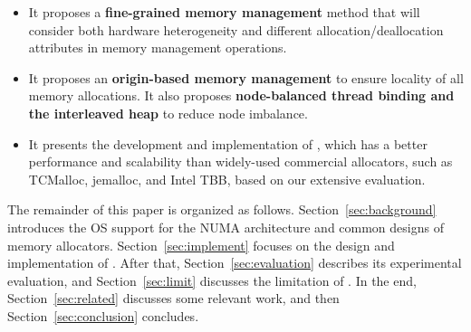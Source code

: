 \begin{itemize}

\item It proposes a \textbf{fine-grained memory management} method that will consider both hardware heterogeneity and different allocation/deallocation attributes in memory management operations.

\item It proposes an \textbf{origin-based memory management} to ensure locality of all memory allocations. It also proposes \textbf{node-balanced thread binding and the interleaved heap} to reduce node imbalance. 

\item It presents the development and implementation of \NM{}, which has a better performance and scalability than widely-used commercial allocators, such as TCMalloc, jemalloc, and Intel TBB, based on our extensive evaluation.  

\end{itemize}

The remainder of this paper is organized as follows. Section~\ref{sec:background} introduces the OS support for the NUMA architecture and common designs of memory allocators. Section~\ref{sec:implement} focuses on the design and implementation of \NM{}. After that, Section~\ref{sec:evaluation} describes its experimental evaluation, and Section~\ref{sec:limit} discusses the limitation of \NM{}. In the end, Section~\ref{sec:related} discusses some relevant work, and then Section~\ref{sec:conclusion} concludes. 